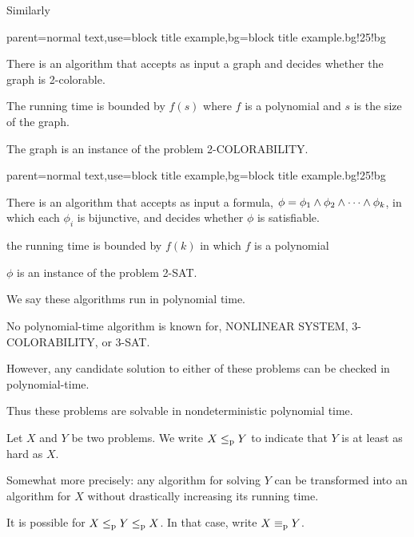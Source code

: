 \documentclass[12pt,xcolor=dvipsnames%
   ]{beamer}
\newcommand{\bigpause}{\pause\bigskip}
\renewcommand{\.}{\cdot}
\newcommand{\reduc}{\leq_{\text{\textnormal{p}}}}
\newcommand{\equivp}{\equiv_{\text{\textnormal{p}}}}
\let\emph=\alert
\begin{document}
\begin{frame}
  Similarly

  {parent=normal text,use=block title example,bg=block title example.bg!25!bg}
  \begin{exampleblock}{}
    There is an algorithm that accepts as input a graph and decides
    whether the graph is 2-colorable.

    \smallskip
    The running time is bounded by $f(s)$ where $f$ is a polynomial and
    $s$ is the size of the graph.
  \end{exampleblock}

  The graph is an instance of the problem 2-COLORABILITY.
\end{frame}

\begin{frame}
%
  {parent=normal text,use=block title example,bg=block title example.bg!25!bg}
  \begin{exampleblock}{}
  There is an algorithm that accepts as input a formula, $\phi = \phi_1 \wedge \phi_2 \wedge \cdots \wedge \phi_k$, in which each $\phi_i$ is bijunctive, and decides whether $\phi$ is satisfiable.
  
  \smallskip
  the running time is bounded by $f(k)$ in which $f$ is a polynomial
  \end{exampleblock}
  
  $\phi$ is an instance of the problem 2-SAT.

\bigpause
  We say these algorithms run in \emph{polynomial time}.
\end{frame}

\begin{frame}
  No polynomial-time algorithm is known for, NONLINEAR SYSTEM,
  3-COLORABILITY, or 3-SAT.

  \bigpause
  However, any candidate solution to either of these problems can be
  checked in polynomial-time. 

  \bigpause
  Thus these problems are solvable in \emph{nondeterministic polynomial
    time.} 
\end{frame}

\begin{frame}
  Let $X$ and $Y$ be two problems. We write $X \reduc Y$ to indicate that
  $Y$ is at least as hard as $X$.

  \bigpause
  Somewhat more precisely: any algorithm for solving $Y$ can be
  transformed into an algorithm for $X$ without drastically increasing
  its running time.

  \bigpause
  It is possible for $X\reduc Y \reduc X$. In that case, write $X\equivp
  Y$. 

\end{frame}
\end{document}
